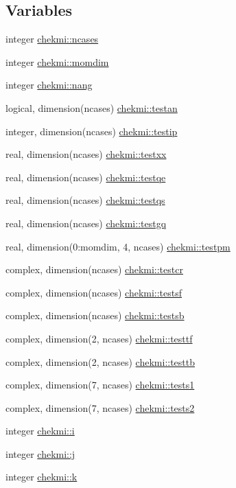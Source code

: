 \subsection*{Variables}
\begin{DoxyCompactItemize}
\item 
integer \hyperlink{namespacechekmi_a7a072a81d4a96e7c6d537baf67910952}{chekmi\+::ncases}
\item 
integer \hyperlink{namespacechekmi_afe35bc0756f5ff0b6d6c0d0e65db8548}{chekmi\+::momdim}
\item 
integer \hyperlink{namespacechekmi_a9ea491c5eb26edc65f7b53a39d16bc45}{chekmi\+::nang}
\item 
logical, dimension(ncases) \hyperlink{namespacechekmi_ae9b410a3ba35714e6fbf24a148da7138}{chekmi\+::testan}
\item 
integer, dimension(ncases) \hyperlink{namespacechekmi_ab52396a3ffb179abce8f932e43f228f8}{chekmi\+::testip}
\item 
real, dimension(ncases) \hyperlink{namespacechekmi_a5a77a3570f10bdc7c249a1f737874688}{chekmi\+::testxx}
\item 
real, dimension(ncases) \hyperlink{namespacechekmi_aee69cac91029367099c7c9e4aa151153}{chekmi\+::testqe}
\item 
real, dimension(ncases) \hyperlink{namespacechekmi_a9451b9e1c1e024ed35194837847e73d3}{chekmi\+::testqs}
\item 
real, dimension(ncases) \hyperlink{namespacechekmi_ae461e282eac8b7dd5dffffde9e1cdfcd}{chekmi\+::testgq}
\item 
real, dimension(0\+:momdim, 4, ncases) \hyperlink{namespacechekmi_a3157f6abe6c10bee0ff0e67a35621556}{chekmi\+::testpm}
\item 
complex, dimension(ncases) \hyperlink{namespacechekmi_a408f74d09a9da3ca7eb6e98302fec068}{chekmi\+::testcr}
\item 
complex, dimension(ncases) \hyperlink{namespacechekmi_a8ec68fd14c1154b5c3bbd7433943536c}{chekmi\+::testsf}
\item 
complex, dimension(ncases) \hyperlink{namespacechekmi_abfd5fc456a9491beedef5d90b582317c}{chekmi\+::testsb}
\item 
complex, dimension(2, ncases) \hyperlink{namespacechekmi_a843b213251154034283b51b4c315cfdd}{chekmi\+::testtf}
\item 
complex, dimension(2, ncases) \hyperlink{namespacechekmi_a47fa67597e3879f8b3b9c044b05a6dc8}{chekmi\+::testtb}
\item 
complex, dimension(7, ncases) \hyperlink{namespacechekmi_a72feac83354e1d6b12318bc4c4c78105}{chekmi\+::tests1}
\item 
complex, dimension(7, ncases) \hyperlink{namespacechekmi_ae467738ccccb2e776eab2a353e503a82}{chekmi\+::tests2}
\item 
integer \hyperlink{namespacechekmi_a2d4be9902cce35087e7b61f8922f6687}{chekmi\+::i}
\item 
integer \hyperlink{namespacechekmi_afaaa1650adb97ff2f8c9c36515034172}{chekmi\+::j}
\item 
integer \hyperlink{namespacechekmi_acf2af53a886da17ecabc9ed0da7c06a3}{chekmi\+::k}
\end{DoxyCompactItemize}


